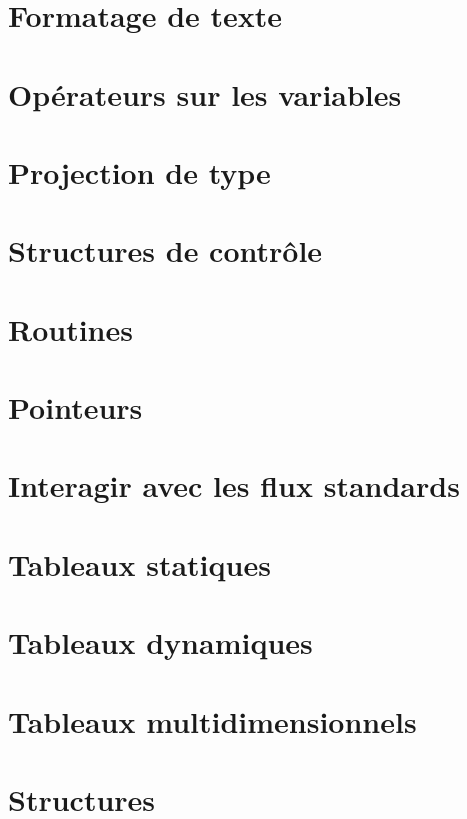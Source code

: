 \documentclass[french]{minitelreport}
\begin{document}
		\section{Formatage de texte}
		
		\section{Opérateurs sur les variables}
		
		\section{Projection de type}
		
		\section{Structures de contrôle}
		
		\section{Routines}
		
		\section{Pointeurs}
		
		\section{Interagir avec les flux standards}
		
		\section{Tableaux statiques}
		
		\section{Tableaux dynamiques}
		
		\section{Tableaux multidimensionnels}
		
		\section{Structures}
		
\end{document}
